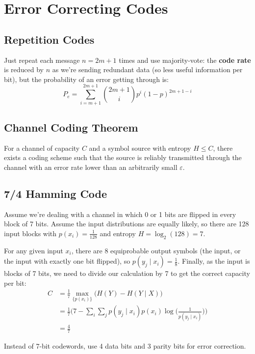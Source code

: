 \documentclass[a4paper, 11pt]{article}
\begin{document}
\section*{Error Correcting Codes}
{
    \subsection*{Repetition Codes}
    {
        Just repeat each message \(n=2m+1\) times and use majority-vote: the \textbf{code rate} is reduced by \(n\) as we're sending redundant data (so less useful information per bit), but the probability of an error getting through is:
        \[P_e = \sum_{i=m+1}^{2m+1}{\binom{2m+1}{i}p^i(1-p)^{2m+1-i}}\]
    }
    \subsection*{Channel Coding Theorem}
    {
        For a channel of capacity \(C\) and a symbol source with entropy \(H \leq C\), there exists a coding scheme such that the source is reliably transmitted through the channel with an error rate lower than an arbitrarily small \(\varepsilon\).
    }
    \subsection*{7/4 Hamming Code}
    {
        Assume we're dealing with a channel in which 0 or 1 bits are flipped in every block of 7 bits. Assume the input distributions are equally likely, so there are 128 input blocks with \(p(x_i) = \frac{1}{128}\) and entropy \(H = \log_2(128) = 7\).

        For any given input \(x_i\), there are 8 equiprobable output symbols (the input, or the input with exactly one bit flipped), so \(p(y_j \mid x_i) = \frac{1}{8}\). Finally, as the input is blocks of 7 bits, we need to divide our calculation by 7 to get the correct capacity per bit:
        \begin{align*}
        C &= \frac{1}{7}\max_{\{p(x_i)\}}{\Big(H(Y) - H(Y \mid X)\Big)} \\
          &= \frac{1}{7}\Big(7 - \sum_i \sum_j {p(y_j \mid x_i)p(x_i) \log\Big(\frac{1}{p(y_j \mid x_i)}\Big) }\Big) \\
          &= \frac{4}{7}
        \end{align*}

        \begin{minipage}[t]{0.8\textwidth}
        \setlength{\parskip}{8pt}
        Instead of 7-bit codewords, use 4 data bits and 3 parity bits for error correction.


\end{minipage}}}
\end{document}
